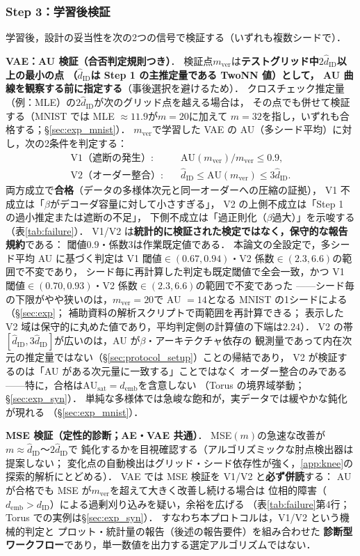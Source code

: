 \documentclass[11pt,a4paper]{jsarticle}
\newcommand{\dID}{d_{\mathrm{ID}}}
\newcommand{\hatdID}{\hat{d}_{\mathrm{ID}}}
\newcommand{\AUsat}{\mathrm{AU}_{\mathrm{sat}}}
\newcommand{\demb}{d_{\mathrm{emb}}}
\begin{document}
\subsubsection{Step 3：学習後検証}\label{sec:protocol_s3}

学習後，設計の妥当性を次の2つの信号で検証する（いずれも複数シードで）．

\textbf{VAE：AU 検証（合否判定規則つき）}．
検証点$m_{\mathrm{ver}}$は\textbf{テストグリッド中$2\hatdID$以上の最小の点
（$\hatdID$は Step 1 の主推定量である TwoNN 値）として，
AU 曲線を観察する前に指定する}（事後選択を避けるため）．
クロスチェック推定量（例：MLE）の$2\hatdID$が次のグリッド点を越える場合は，
その点でも併せて検証する（MNIST では MLE $\approx 11.9$が$m = 20$に加えて
$m = 32$を指し，いずれも合格する；§\ref{sec:exp_mnist}）．
$m_{\mathrm{ver}}$で学習した VAE の AU（多シード平均）に対し，次の2条件を判定する：
\begin{align}
  \text{V1（遮断の発生）}:&\quad \mathrm{AU}(m_{\mathrm{ver}}) / m_{\mathrm{ver}} \leq 0.9,
  \label{eq:rule_v1}\\
  \text{V2（オーダー整合）}:&\quad \hatdID \leq \mathrm{AU}(m_{\mathrm{ver}}) \leq 3\hatdID.
  \label{eq:rule_v2}
\end{align}
両方成立で\textbf{合格}（データの多様体次元と同一オーダーへの圧縮の証拠），
V1 不成立は「$\beta$がデコーダ容量に対して小さすぎる」，
V2 の上側不成立は「Step 1 の過小推定または遮断の不足」，
下側不成立は「過正則化（$\beta$過大）」を示唆する（表\ref{tab:failure}）．
V1/V2 は\textbf{統計的に検証された検定ではなく，保守的な報告規約}である：
閾値$0.9$・係数$3$は作業既定値である．
本論文の全設定で，多シード平均 AU に基づく判定は
V1 閾値$\in (0.67, 0.94)$・V2 係数$\in (2.3, 6.6)$の範囲で不変であり，
シード毎に再計算した判定も既定閾値で全会一致，かつ
V1 閾値$\in (0.70, 0.93)$・V2 係数$\in (2.3, 6.6)$の範囲で不変であった
——シード毎の下限がやや狭いのは，$m_{\mathrm{ver}} = 20$で AU $= 14$となる
MNIST の1シードによる（§\ref{sec:exp}；
補助資料の解析スクリプトで両範囲を再計算できる；
表示した V2 域は保守的に丸めた値であり，平均判定側の計算値の下端は$2.24$）．
V2 の帯$[\hatdID, 3\hatdID]$が広いのは，AU が$\beta$・アーキテクチャ依存の
観測量であって内在次元の推定量ではない（§\ref{sec:protocol_setup}）ことの帰結であり，
V2 が検証するのは「AU がある次元量に一致する」ことではなく
オーダー整合のみである——特に，合格は$\AUsat = \demb$を含意しない
（Torus の境界域挙動；§\ref{sec:exp_syn}）．
単純な多様体では急峻な飽和が，実データでは緩やかな鈍化が現れる
（§\ref{sec:exp_mnist}）．

\textbf{MSE 検証（定性的診断；AE・VAE 共通）}．
MSE$(m)$の急速な改善が$m \approx \hatdID$〜$2\hatdID$で
鈍化するかを目視確認する（アルゴリズミックな肘点検出器は提案しない；
変化点の自動検出はグリッド・シード依存性が強く，\ref{app:knee}の
探索的解析にとどめる）．
VAE では MSE 検証を V1/V2 と\textbf{必ず併読}する：
AU が合格でも MSE が$m_{\mathrm{ver}}$を超えて大きく改善し続ける場合は
位相的障害（$\demb > \dID$）による過剰刈り込みを疑い，余裕を広げる
（表\ref{tab:failure}第4行；Torus での実例は§\ref{sec:exp_syn}）．
すなわち本プロトコルは，V1/V2 という機械的判定と
プロット・統計量の報告（後述の報告要件）を組み合わせた
\textbf{診断型ワークフロー}であり，単一数値を出力する選定アルゴリズムではない．
\end{document}
